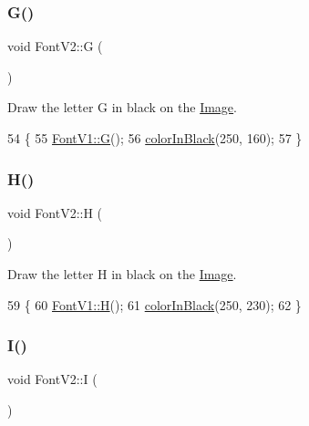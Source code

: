 \subsubsection{\texorpdfstring{G()}{G()}}
{\footnotesize\ttfamily void Font\+V2\+::G (\begin{DoxyParamCaption}{ }\end{DoxyParamCaption})}



Draw the letter G in black on the \mbox{\hyperlink{class_image}{Image}}. 


\begin{DoxyCode}
54                \{
55     \mbox{\hyperlink{class_font_v1_a9806041ba05556826ba6b4a0760fcee4}{FontV1::G}}();
56     \mbox{\hyperlink{class_font_v2_a04f2501961bc286ce70fbb6a840b0e8a}{colorInBlack}}(250, 160);
57 \}
\end{DoxyCode}
\mbox{\label{class_font_v2_af03f8d436cc22f57b2bdd471b265896e}} 
\subsubsection{\texorpdfstring{H()}{H()}}
{\footnotesize\ttfamily void Font\+V2\+::H (\begin{DoxyParamCaption}{ }\end{DoxyParamCaption})}



Draw the letter H in black on the \mbox{\hyperlink{class_image}{Image}}. 


\begin{DoxyCode}
59                \{
60     \mbox{\hyperlink{class_font_v1_aac6c3d7f8116c21fd9339d07aa63a797}{FontV1::H}}();
61     \mbox{\hyperlink{class_font_v2_a04f2501961bc286ce70fbb6a840b0e8a}{colorInBlack}}(250, 230);
62 \}
\end{DoxyCode}
\mbox{\label{class_font_v2_aaace3b75c86f0536789a232f5b38321d}} 
\subsubsection{\texorpdfstring{I()}{I()}}
{\footnotesize\ttfamily void Font\+V2\+::I (\begin{DoxyParamCaption}{ }\end{DoxyParamCaption})}



